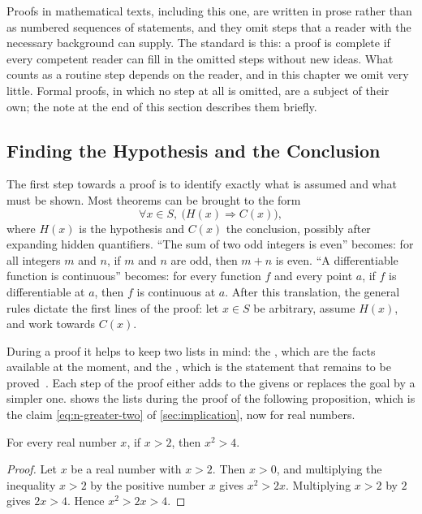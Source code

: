 Proofs in mathematical texts, including this one, are written in prose rather than as numbered sequences of statements, and they omit steps that a reader with the necessary background can supply. The standard is this: a proof is complete if every competent reader can fill in the omitted steps without new ideas. What counts as a routine step depends on the reader, and in this chapter we omit very little. Formal proofs, in which no step at all is omitted, are a subject of their own; the note at the end of this section describes them briefly.

\subsection{Finding the Hypothesis and the Conclusion}

The first step towards a proof is to identify exactly what is assumed and what must be shown. Most theorems can be brought to the form
\[
\forall x\in S,\ \bigl(H(x)\Rightarrow C(x)\bigr),
\]
where $H(x)$ is the hypothesis and $C(x)$ the conclusion, possibly after expanding hidden quantifiers. ``The sum of two odd integers is even'' becomes: for all integers $m$ and $n$, if $m$ and $n$ are odd, then $m+n$ is even. ``A differentiable function is continuous'' becomes: for every function $f$ and every point $a$, if $f$ is differentiable at $a$, then $f$ is continuous at $a$. After this translation, the general rules dictate the first lines of the proof: let $x\in S$ be arbitrary, assume $H(x)$, and work towards $C(x)$.

During a proof it helps to keep two lists in mind: the , which are the facts available at the moment, and the , which is the statement that remains to be proved~\cite{velleman2019}. Each step of the proof either adds to the givens or replaces the goal by a simpler one.  shows the lists during the proof of the following proposition, which is the claim \eqref{eq:n-greater-two} of \cref{sec:implication}, now for real numbers.

\begin{proposition}
\label{prop:x-greater-two}
For every real number $x$, if $x>2$, then $x^2>4$.
\end{proposition}

\begin{proof}
Let $x$ be a real number with $x>2$. Then $x>0$, and multiplying the inequality $x>2$ by the positive number $x$ gives $x^2>2x$. Multiplying $x>2$ by $2$ gives $2x>4$. Hence $x^2>2x>4$.
\end{proof}


